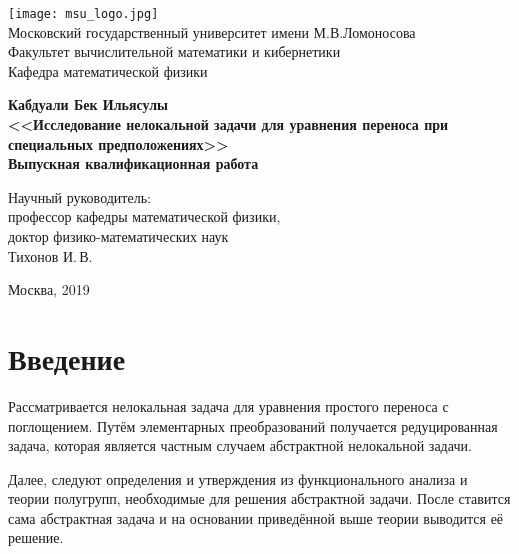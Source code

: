 \documentclass{article}
\theoremstyle{definition}
\begin{document}
	\begin{titlepage}
		\begin{center}
			\texttt{[image: msu\_logo.jpg]}
			\small
			~\\[0.1cm]
			Московский государственный университет имени М.В.Ломоносова
			~\\[0.1cm]
			Факультет вычислительной математики и кибернетики
			~\\[0.1cm]
			Кафедра математической физики
			~\\[1.0cm]
			\normalsize
		\end{center}
	
  	\vspace{1.5cm}
\begin{center}
	\textbf{\large{Кабдуали Бек Ильясулы}}
	\\[2cm]
	\textbf{\large {<<Исследование нелокальной задачи для уравнения переноса при специальных предположениях>>}}
	\\[1.5cm]
	
	\textbf{\large Выпускная квалификационная работа}
	\\[1cm]
	\begin{normalsize}
		\begin{flushright}
			\small
			Научный руководитель:
			\\
			профессор кафедры математической физики,\\ доктор физико-математических наук
			\\
			Тихонов И.\,В.
		\end{flushright}
		\normalsize
	\end{normalsize}
	\vfill 
	
	\small{Москва, 2019}
\end{center} 

	\end{titlepage}

\newpage

\tableofcontents

\newpage

\section*{Введение}
Рассматривается нелокальная задача для уравнения простого переноса с поглощением. 
Путём элементарных преобразований получается редуцированная задача,
которая является частным случаем абстрактной нелокальной задачи. 

Далее, следуют определения и утверждения из функционального анализа и теории полугрупп, необходимые для решения абстрактной задачи. После ставится сама абстрактная задача и на основании приведённой выше теории выводится её решение.
\end{document}
